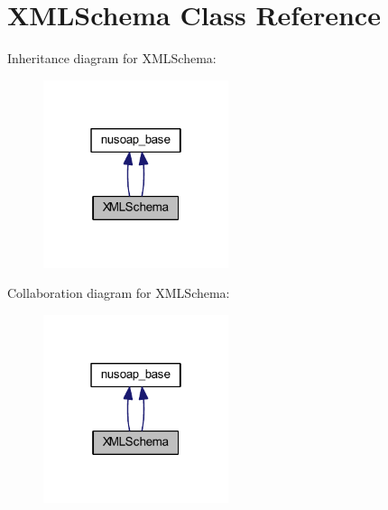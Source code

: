 \hypertarget{class_x_m_l_schema}{\section{X\-M\-L\-Schema Class Reference}
\label{class_x_m_l_schema}
}


Inheritance diagram for X\-M\-L\-Schema\-:
\nopagebreak
\begin{figure}[H]
\begin{center}
\leavevmode
\includegraphics[width=154pt]{class_x_m_l_schema__inherit__graph}
\end{center}
\end{figure}


Collaboration diagram for X\-M\-L\-Schema\-:
\nopagebreak
\begin{figure}[H]
\begin{center}
\leavevmode
\includegraphics[width=154pt]{class_x_m_l_schema__coll__graph}
\end{center}
\end{figure}
